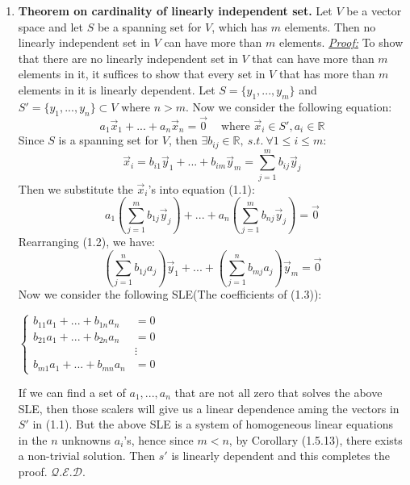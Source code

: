 \documentclass[oneside, 12pt]{book}
\newcommand{\settag}[1]{\renewcommand{\theenumi}{#1}}
\newcommand{\R}{\mathbb{R}}
\newcommand{\qed}{\hfill $\mathcal{Q}.\mathcal{E}.\mathcal{D}.$}
\newcommand{\tbf}[1]{\textbf{#1}}
\newcommand{\tit}[1]{\textit{#1}}
\begin{document}
\begin{enumerate}
        \settag{1.6.10}
        \item \tbf{Theorem on cardinality of linearly independent set.} Let $V$ be a vector space and let $S$ be a spanning set for $V$, which has $m$ elements. Then no linearly independent set in $V$ can have more than $m$ elements.\newline
        \tit{\underline{Proof:}}\newline
        To show that there are no linearly independent set in $V$ that can have more than $m$ elements in it, it suffices to show that every set in $V$ that has more than $m$ elements in it is linearly dependent. Let $S=\{y_1,...,y_m\}$ and $S'=\{y_1,...,y_n\}\subset V$ where $n>m$. Now we consider the following equation:
        \begin{equation}
            a_1\vec{x}_1 + ... + a_n\vec{x}_n = \vec{0}~~~~\text{    where }\vec{x}_i \in S',a_i\in \R
        \end{equation}
        Since $S$ is a spanning set for $V$, then $\exists b_{ij}\in \R,~s.t.~\forall 1\leq i \leq m$:
        \begin{equation*}
            \vec{x}_i = b_{i1}\vec{y}_1 + ... + b_{im}\vec{y}_m = \sum_{j=1}^{m}b_{ij}\vec{y}_j
        \end{equation*}
        Then we substitute the $\vec{x}_i$'s into equation (1.1):
        \begin{equation}
            a_1\left(\sum_{j=1}^{m}b_{1j}\vec{y}_j\right) + ... +  a_n\left(\sum_{j=1}^{m}b_{nj}\vec{y}_j\right) = \vec{0}
        \end{equation}
        Rearranging (1.2), we have:
        \begin{equation}
            \left(\sum_{j=1}^{n}b_{1j}a_{j}\right)\vec{y}_1 + ... +  \left(\sum_{j=1}^{n}b_{mj}a_{j}\right)\vec{y}_m = \vec{0}
        \end{equation}
        Now we consider the following SLE(The coefficients of (1.3)):
        \begin{center}
            $
            \begin{cases}
            b_{11}a_1 + ... + b_{1n}a_n &= 0 \\
            b_{21}a_1 + ... + b_{2n}a_n &= 0 \\
            &\vdots \\
            b_{m1}a_1 + ... + b_{mn}a_n &= 0
            \end{cases}
            $
        \end{center}
        If we can find a set of $a_1, ..., a_n$ that are not all zero that solves the above SLE, then those scalers will give us a linear dependence aming the vectors in $S'$ in (1.1). But the above SLE is a system of homogeneous linear equations in the $n$ unknowns $a_i$'s, hence since $m < n$, by Corollary (1.5.13), there exists a non-trivial solution. Then $s'$ is linearly dependent and this completes the proof. \qed
        

\end{enumerate}
\end{document}
